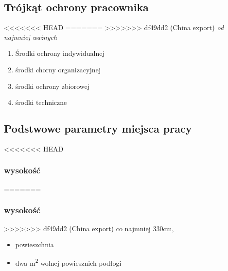 \documentclass[11pt]{article}
\begin{document}
\subsection{Trójkąt ochrony pracownika}
<<<<<<< HEAD
\label{sec:orga5920e5}
=======
\label{sec:org6b5b530}
>>>>>>> df49dd2 (China export)
\emph{od najmniej ważnych}
\begin{enumerate}
\item Środki ochrony indywidualnej
\item środki chorny organizacyjnej
\item środki ochrony zbiorowej
\item środki techniczne
\end{enumerate}
\subsection{Podstwowe parametry miejsca pracy}
<<<<<<< HEAD
\label{sec:orgb194246}
\subsubsection{wysokość}
\label{sec:orge1c56fd}
=======
\label{sec:org0d98a5f}
\subsubsection{wysokość}
\label{sec:org1403e45}
>>>>>>> df49dd2 (China export)
co najmniej 330cm,
\begin{itemize}
\item powieszchnia
\item dwa m\textsuperscript{2} wolnej powiesznich podłogi
\end{itemize}
\end{document}
